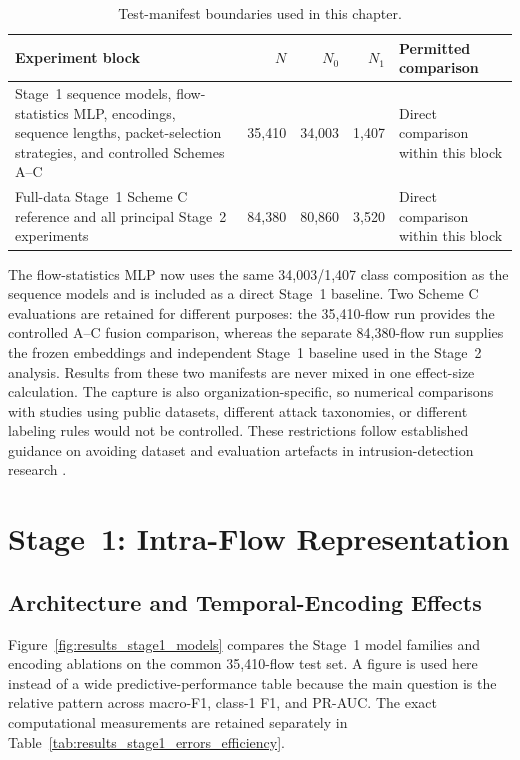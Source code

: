 \begin{table}[htbp]
    \centering
    \caption{Test-manifest boundaries used in this chapter.}
    \label{tab:results_manifest_scope}
    \begin{tabular}{@{}p{5.1cm}rrrp{4.9cm}@{}}
        \toprule
        Experiment block & $N$ & $N_0$ & $N_1$ & Permitted comparison \\
        \midrule
        Stage~1 sequence models, flow-statistics MLP, encodings, sequence
        lengths, packet-selection strategies, and controlled Schemes A--C
        & 35,410 & 34,003 & 1,407 & Direct comparison within this block \\
        Full-data Stage~1 Scheme C reference and all principal Stage~2 experiments
        & 84,380 & 80,860 & 3,520 & Direct comparison within this block \\
        \bottomrule
    \end{tabular}
\end{table}

The flow-statistics MLP now uses the same 34,003/1,407 class composition as the
sequence models and is included as a direct Stage~1 baseline. Two Scheme C
evaluations are retained for different purposes: the 35,410-flow run provides
the controlled A--C fusion comparison, whereas the separate 84,380-flow run
supplies the frozen embeddings and independent Stage~1 baseline used in the
Stage~2 analysis. Results from these two manifests are never mixed in one
effect-size calculation. The capture is also
organization-specific, so numerical comparisons with studies using public
datasets, different attack taxonomies, or different labeling rules would not
be controlled. These restrictions follow established guidance on avoiding
dataset and evaluation artefacts in intrusion-detection research
\cite{SommerPaxson2010,Arp2022DosDonts}.

\section{Stage~1: Intra-Flow Representation}
\label{subsec:results_stage1}

\subsection{Architecture and Temporal-Encoding Effects}
\label{subsubsec:results_stage1_models}

Figure~\ref{fig:results_stage1_models} compares the Stage~1 model families and
encoding ablations on the common 35,410-flow test set. A figure is used here
instead of a wide predictive-performance table because the main question is
the relative pattern across macro-F1, class-1 F1, and PR-AUC. The exact
computational measurements are retained separately in
Table~\ref{tab:results_stage1_errors_efficiency}.

